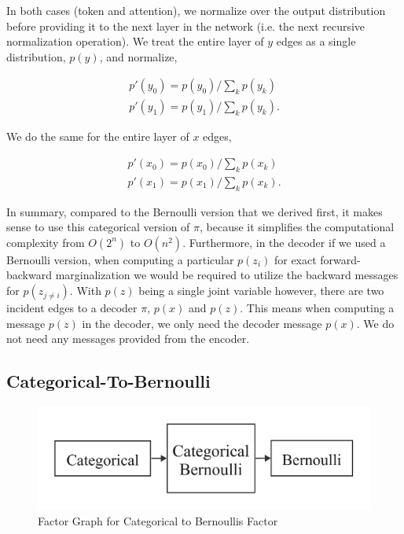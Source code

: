 \documentclass{article}
\begin{document}
In both cases (token and attention), we normalize over the  output distribution before providing it to the next layer in the network (i.e. the next recursive normalization operation).  We treat the entire layer of $y$ edges as a single distribution, $p(y)$, and normalize,

\begin{eqnarray}
    p'(y_0) = p(y_0)/\sum_k p(y_k) \nonumber \\
    p'(y_1) = p(y_1)/\sum_k p(y_k).
\end{eqnarray}

We do the same for the entire layer of $x$ edges,

\begin{eqnarray}
    p'(x_0) = p(x_0)/\sum_k p(x_k) \nonumber \\
    p'(x_1) = p(x_1)/\sum_k p(x_k).
\end{eqnarray}

In summary, compared to the Bernoulli version that we derived first, it makes sense to use this categorical version of $\pi$, because it simplifies the computational complexity from $O(2^n)$ to $O(n^2)$.  Furthermore, in the decoder if we used a Bernoulli version, when computing a particular $p(z_i)$ for exact forward-backward marginalization we would be required to utilize the backward messages for $p(z_{j \neq i})$.  With $p(z)$ being a single joint variable however, there are two incident edges to a decoder $\pi$, $p(x)$ and $p(z)$.  This means when computing a message $p(z)$ in the decoder, we only need the decoder message $p(x)$.  We do not need any messages provided from the encoder.


\subsection{Categorical-To-Bernoulli}\label{appendix:Categorical-To-Bernoulli}

\begin{figure}[H]
    \centering
    \includegraphics[scale=0.15]{figures/categorical-bernoulli.pdf}
    \caption{Factor Graph for Categorical to Bernoullis Factor}
    \label{fig:categorical-to-bernoulli-single}
\end{figure}
\end{document}
